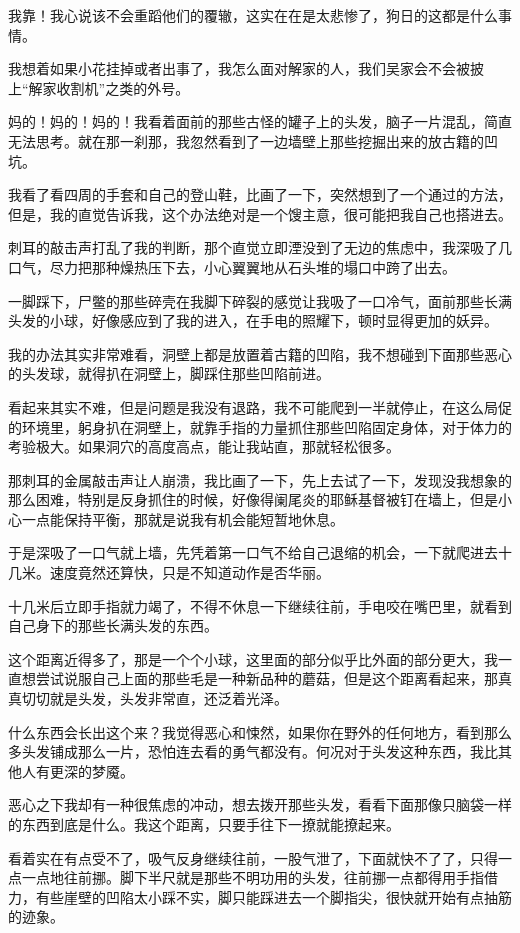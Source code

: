 我靠！我心说该不会重蹈他们的覆辙，这实在在是太悲惨了，狗日的这都是什么事情。

我想着如果小花挂掉或者出事了，我怎么面对解家的人，我们吴家会不会被披上“解家收割机”之类的外号。

妈的！妈的！妈的！我看着面前的那些古怪的罐子上的头发，脑子一片混乱，简直无法思考。就在那一刹那，我忽然看到了一边墙壁上那些挖掘出来的放古籍的凹坑。

我看了看四周的手套和自己的登山鞋，比画了一下，突然想到了一个通过的方法，但是，我的直觉告诉我，这个办法绝对是一个馊主意，很可能把我自己也搭进去。

刺耳的敲击声打乱了我的判断，那个直觉立即湮没到了无边的焦虑中，我深吸了几口气，尽力把那种燥热压下去，小心翼翼地从石头堆的塌口中跨了出去。

一脚踩下，尸鳖的那些碎壳在我脚下碎裂的感觉让我吸了一口冷气，面前那些长满头发的小球，好像感应到了我的进入，在手电的照耀下，顿时显得更加的妖异。

我的办法其实非常难看，洞壁上都是放置着古籍的凹陷，我不想碰到下面那些恶心的头发球，就得扒在洞壁上，脚踩住那些凹陷前进。

看起来其实不难，但是问题是我没有退路，我不可能爬到一半就停止，在这么局促的环境里，躬身扒在洞壁上，就靠手指的力量抓住那些凹陷固定身体，对于体力的考验极大。如果洞穴的高度高点，能让我站直，那就轻松很多。

那刺耳的金属敲击声让人崩溃，我比画了一下，先上去试了一下，发现没我想象的那么困难，特别是反身抓住的时候，好像得阑尾炎的耶稣基督被钉在墙上，但是小心一点能保持平衡，那就是说我有机会能短暂地休息。

于是深吸了一口气就上墙，先凭着第一口气不给自己退缩的机会，一下就爬进去十几米。速度竟然还算快，只是不知道动作是否华丽。

十几米后立即手指就力竭了，不得不休息一下继续往前，手电咬在嘴巴里，就看到自己身下的那些长满头发的东西。

这个距离近得多了，那是一个个小球，这里面的部分似乎比外面的部分更大，我一直想尝试说服自己上面的那些毛是一种新品种的蘑菇，但是这个距离看起来，那真真切切就是头发，头发非常直，还泛着光泽。

什么东西会长出这个来？我觉得恶心和悚然，如果你在野外的任何地方，看到那么多头发铺成那么一片，恐怕连去看的勇气都没有。何况对于头发这种东西，我比其他人有更深的梦魇。

恶心之下我却有一种很焦虑的冲动，想去拨开那些头发，看看下面那像只脑袋一样的东西到底是什么。我这个距离，只要手往下一撩就能撩起来。

看着实在有点受不了，吸气反身继续往前，一股气泄了，下面就快不了了，只得一点一点地往前挪。脚下半尺就是那些不明功用的头发，往前挪一点都得用手指借力，有些崖壁的凹陷太小踩不实，脚只能踩进去一个脚指尖，很快就开始有点抽筋的迹象。

